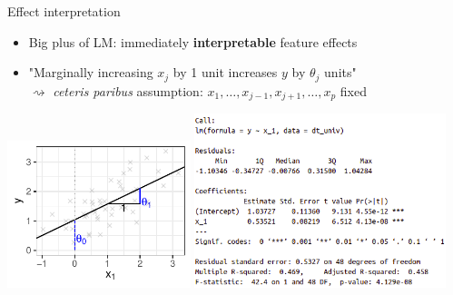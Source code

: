 \documentclass[11pt,compress,t,notes=noshow, xcolor=table]{beamer}
\begin{document}

\begin{vbframe}{Effect interpretation}

\begin{itemize}
    \item Big plus of LM: immediately \textbf{interpretable} feature effects
    \item "Marginally increasing $x_j$ by 1 unit increases $y$ by $\theta_j$ 
    units" \\
    $\rightsquigarrow$ \textit{ceteris paribus} assumption: 
    $x_1, \dots, x_{j - 1}, x_{j + 1}, \dots, x_p$ fixed
\end{itemize}

\vfill
\includegraphics[width=0.4\textwidth]{figure/reg_l2_basic_lm_interpreted.pdf} 
\hfill
\includegraphics[width=0.55\textwidth]{figure_man/lm_summary} 

\end{vbframe}

\end{document}
